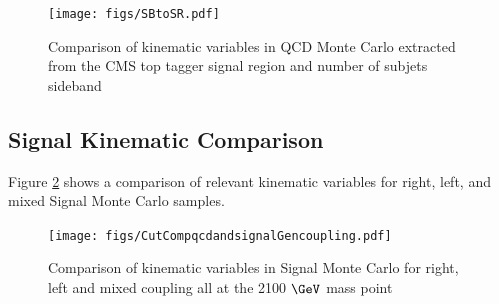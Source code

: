 \begin{figure}[Htcb]
\centering
\texttt{[image: figs/SBtoSR.pdf]}
\caption{Comparison of kinematic variables in QCD Monte Carlo extracted from the CMS top tagger signal region and number of subjets sideband}
\label{figs:SBtoSR}
\end{figure}



\subsection{Signal Kinematic Comparison}
\label{sec:SigKinGen}
Figure \ref{figs:genkin} shows a comparison of relevant kinematic variables for right, left, and mixed Signal Monte Carlo samples.


\begin{figure}[Htcb]
\centering
\texttt{[image: figs/CutCompqcdandsignalGencoupling.pdf]}
\caption{Comparison of kinematic variables in Signal Monte Carlo for right, left and mixed coupling all at the 2100$~\GeV$ mass point }
\label{figs:genkin}
\end{figure}






